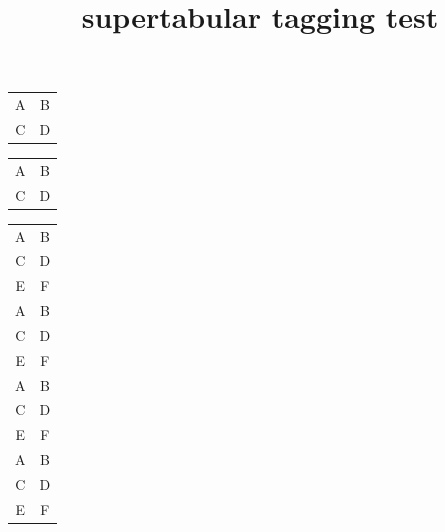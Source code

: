 \documentclass{article}
\title{supertabular tagging test}
\begin{document}
\begin{supertabular}{cc}
A & B \\
C & D \\
\end{supertabular} 

\begin{center}
\begin{supertabular}{cc}
A & B \\
C & D \\
\end{supertabular} 
\end{center}

\vspace{5in}

\begin{supertabular}{cc}
A & B \\
C & D \\
E & F \\
A & B \\
C & D \\
E & F \\
A & B \\
C & D \\
E & F \\
A & B \\
C & D \\
E & F \\
\end{supertabular}
\end{document}
